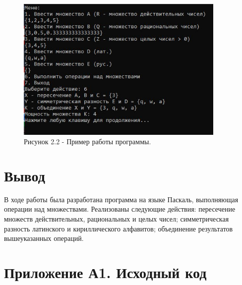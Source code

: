 \documentclass[oneside,a4paper,14pt]{extarticle}
\begin{document}
\begin{figure}[H]
	\centering
	\includegraphics[width=0.9\textwidth]{pics/photo2.jpg}
	\caption*{Рисунок 2.2 - Пример работы программы.}
\end{figure}

\section*{Вывод}


В ходе работы была разработана программа на языке Паскаль, выполняющая операции над множествами. Реализованы следующие действия: пересечение множеств действительных, рациональных и целых чисел; симметрическая разность латинского и кириллического алфавитов; объединение результатов вышеуказанных операций.

\newpage
\section*{Приложение А1. Исходный код}
\inputminted{pascal}{code/main.pas}
\end{document}
